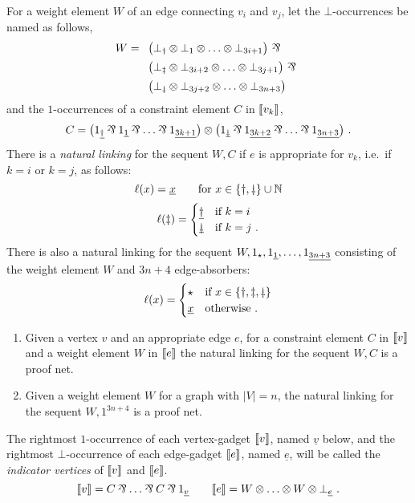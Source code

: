 \documentclass[conference]{IEEEtran}
\let\alt=\underline
\begin{document}
For a weight element $W$ of an edge connecting $v_i$ and $v_j$, let the $\bot$-occurrences be named as follows,
\[
	W = \begin{array}[t]{l}
				 \big(\named{    \dagger}\bot\tn\named{   1}\bot\tn\dotsc\tn\named{3i+1}\bot\big) 
	~\parr\\[5pt] \big(\named{   \ddagger}\bot\tn\named{3i+2}\bot\tn\dotsc\tn\named{3j+1}\bot\big)
	~\parr\\[5pt] \big(\named{\downdagger}\bot\tn\named{3j+2}\bot\tn\dotsc\tn\named{3n+3}\bot\big)
	\end{array}
\]
and the $1$-occurrences of a constraint element $C$ in $\llbracket v_k\rrbracket$,
\[
	C = \big(\named{\alt    \dagger}1\parr\named{\alt{   1}}1\parr\dotso\parr\named{\alt{3k+1}}1\big)
	\tn \big(\named{\alt\downdagger}1\parr\named{\alt{3k+2}}1\parr\dotso\parr\named{\alt{3n+3}}1\big)~.
\]
There is a \emph{natural linking} for the sequent $W,C$ if $e$ is appropriate for $v_k$, i.e.\ if $k=i$ or $k=j$, as follows:
\[
	\links(x) = \alt x \qquad \text{for }x\in\{\dagger,\downdagger\}\cup\mathbb N
\]
\[
	\links(\ddagger)=
	\begin{cases}
		\alt	\dagger & \text{if }k=i \\
		\alt\downdagger & \text{if }k=j~.
	\end{cases}
\]
There is also a natural linking for the sequent $W,\named\star 1,\named{\alt 1}1,\dotsc,\named{\alt {3n+3}}1$ consisting of the weight element $W$ and $3n+4$ edge-absorbers:
\[
	\links(x)=
	\begin{cases}
		\star  & \text{if }x\in\{\dagger,\ddagger,\downdagger\} \\
		\alt x & \text{otherwise }.
	\end{cases}
\]


\begin{proposition}
\label{prop:element linkings}
\begin{enumerate}
	\item
Given a vertex $v$ and an appropriate edge $e$, for a constraint element $C$ in $\llbracket v\rrbracket$ and a weight element $W$ in $\llbracket e\rrbracket$ the natural linking for the sequent $W,C$ is a proof net.
	\item
Given a weight element $W$ for a graph with $|V|=n$, the natural linking for the sequent $W,1^{3n+4}$ is a proof net.
\end{enumerate}
\end{proposition}


The rightmost $1$-occurrence of each vertex-gadget $\llbracket v\rrbracket$, named $\alt v$ below, and the rightmost $\bot$-occurrence of each edge-gadget $\llbracket e\rrbracket$, named $\alt e$, will be called the \emph{indicator vertices} of $\llbracket v\rrbracket$ and $\llbracket e\rrbracket$.
\[	
	\itn v = C\parr\dotso\parr C\parr \named{\alt v}1 \qquad \itn e= W\tn\dotso\tn W\tn\named{\alt e}\bot~.
\]
\end{document}
